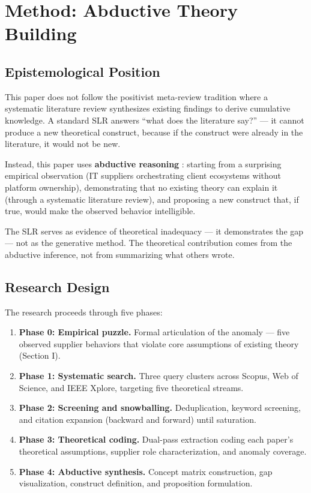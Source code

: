 \section{Method: Abductive Theory Building}

\subsection{Epistemological Position}

This paper does not follow the positivist meta-review tradition where a systematic literature review synthesizes existing findings to derive cumulative knowledge. A standard SLR answers ``what does the literature say?'' --- it cannot produce a new theoretical construct, because if the construct were already in the literature, it would not be new.

Instead, this paper uses \textbf{abductive reasoning} \citep{DuboisGadde2002}: starting from a surprising empirical observation (IT suppliers orchestrating client ecosystems without platform ownership), demonstrating that no existing theory can explain it (through a systematic literature review), and proposing a new construct that, if true, would make the observed behavior intelligible.

The SLR serves as evidence of theoretical inadequacy --- it demonstrates the gap --- not as the generative method. The theoretical contribution comes from the abductive inference, not from summarizing what others wrote.

\subsection{Research Design}

The research proceeds through five phases:

\begin{enumerate}
    \item \textbf{Phase 0: Empirical puzzle.} Formal articulation of the anomaly --- five observed supplier behaviors that violate core assumptions of existing theory (Section I).
    \item \textbf{Phase 1: Systematic search.} Three query clusters across Scopus, Web of Science, and IEEE Xplore, targeting five theoretical streams.
    \item \textbf{Phase 2: Screening and snowballing.} Deduplication, keyword screening, and citation expansion (backward and forward) until saturation.
    \item \textbf{Phase 3: Theoretical coding.} Dual-pass extraction coding each paper's theoretical assumptions, supplier role characterization, and anomaly coverage.
    \item \textbf{Phase 4: Abductive synthesis.} Concept matrix construction, gap visualization, construct definition, and proposition formulation.
\end{enumerate}

